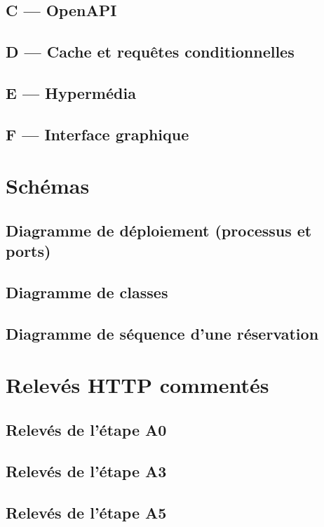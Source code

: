 \documentclass[11pt,a4paper]{report}
\begin{document}
\section{C --- OpenAPI}
\section{D --- Cache et requêtes conditionnelles}
\section{E --- Hypermédia}
\section{F --- Interface graphique}

\chapter{Schémas}
\section{Diagramme de déploiement (processus et ports)}
\section{Diagramme de classes}
\section{Diagramme de séquence d'une réservation}

\chapter{Relevés HTTP commentés}
\section{Relevés de l'étape A0}
\section{Relevés de l'étape A3}
\section{Relevés de l'étape A5}
\end{document}
